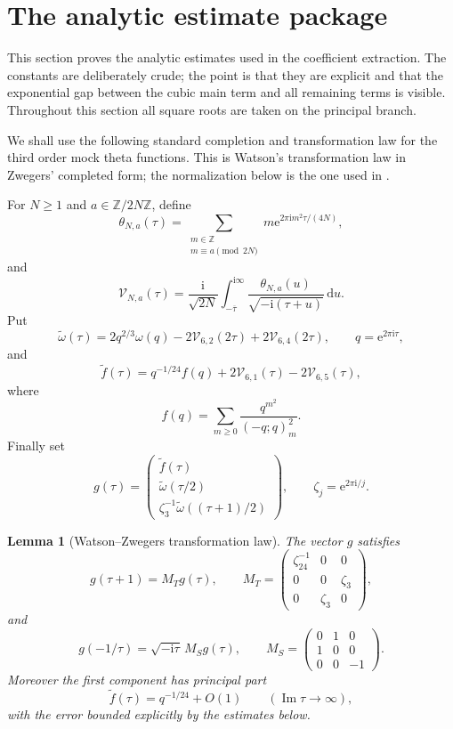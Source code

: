 \documentclass[11pt]{article}
\newtheorem{lemma}[theorem]{Lemma}
\theoremstyle{remark}
\newcommand{\ii}{\mathrm i}
\newcommand{\e}{\mathrm e}
\newcommand{\dd}{\mathrm d}
\newcommand{\Z}{\mathbb Z}
\newcommand{\Impart}{\operatorname{Im}}
\begin{document}
\section{The analytic estimate package}\label{sec:estimate-package}

This section proves the analytic estimates used in the coefficient extraction.  The
constants are deliberately crude; the point is that they are explicit and that the
exponential gap between the cubic main term and all remaining terms is visible.
Throughout this section all square roots are taken on the principal branch.

We shall use the following standard completion and transformation law for the third
order mock theta functions.  This is Watson's transformation law in Zwegers'
completed form; the normalization below is the one used in \cite{ZwegersThesis,GarvanMukhopadhyay}.

For $N\geq1$ and $a\in\Z/2N\Z$, define
\[
\theta_{N,a}(\tau)=\sum_{\substack{m\in\Z\\ m\equiv a\pmod{2N}}}
 m\e^{2\pi\ii m^2\tau/(4N)},
\]
and
\[
\mathcal V_{N,a}(\tau)
=
\frac{\ii}{\sqrt{2N}}
\int_{-\overline\tau}^{\ii\infty}
\frac{\theta_{N,a}(u)}{\sqrt{-\ii(\tau+u)}}\,\dd u.
\]
Put
\[
\widetilde\omega(\tau)
=
2q^{2/3}\omega(q)-2\mathcal V_{6,2}(2\tau)+2\mathcal V_{6,4}(2\tau),
\qquad q=\e^{2\pi\ii\tau},
\]
and
\[
\widetilde f(\tau)
=
q^{-1/24}f(q)+2\mathcal V_{6,1}(\tau)-2\mathcal V_{6,5}(\tau),
\]
where
\[
f(q)=\sum_{m\geq0}\frac{q^{m^2}}{(-q;q)_m^2}.
\]
Finally set
\[
g(\tau)=
\begin{pmatrix}
\widetilde f(\tau)\\
\widetilde\omega(\tau/2)\\
\zeta_3^{-1}\widetilde\omega((\tau+1)/2)
\end{pmatrix},
\qquad
\zeta_j=\e^{2\pi\ii/j}.
\]

\begin{lemma}[Watson--Zwegers transformation law]\label{lem:wz-transform}
The vector $g$ satisfies
\begin{equation}\label{eq:gT}
g(\tau+1)=M_Tg(\tau),
\qquad
M_T=
\begin{pmatrix}
\zeta_{24}^{-1}&0&0\\
0&0&\zeta_3\\
0&\zeta_3&0
\end{pmatrix},
\end{equation}
and
\begin{equation}\label{eq:gS}
g(-1/\tau)=\sqrt{-\ii\tau}\,M_Sg(\tau),
\qquad
M_S=
\begin{pmatrix}
0&1&0\\
1&0&0\\
0&0&-1
\end{pmatrix}.
\end{equation}
Moreover the first component has principal part
\begin{equation}\label{eq:f-principal-part}
\widetilde f(\tau)=q^{-1/24}+O(1)
\qquad (\Impart \tau\to\infty),
\end{equation}
with the error bounded explicitly by the estimates below.
\end{lemma}
\end{document}
